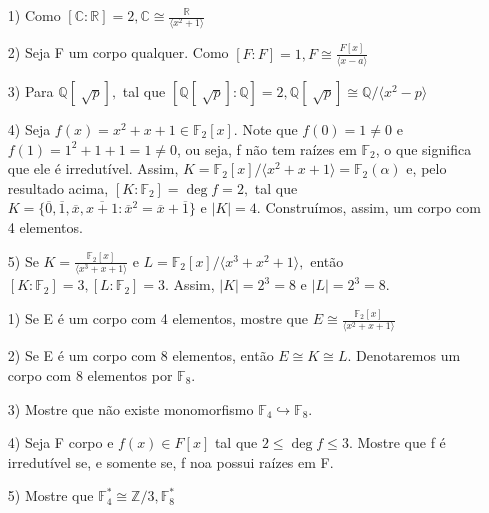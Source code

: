 \documentclass[algebraII_notes.tex]{subfiles}
\begin{document}
\begin{example}
	\begin{itemize}
		\item[1)] Como \([\mathbb{C}:\mathbb{R}]=2, \mathbb{C}\cong{\frac{\mathbb{R}}{\langle x^{2} + 1 \rangle}}\)
		\item[2)] Seja F um corpo qualquer. Como \([F:F] = 1, F\cong{\frac{F[x]}{\langle x-a \rangle}}\)
		\item[3)] Para \(\mathbb{Q}[\sqrt[]{p}],\) tal que \([\mathbb{Q}[\sqrt[]{p}]:\mathbb{Q}]=2, \mathbb{Q}[\sqrt[]{p}]\cong{\mathbb{Q}/\langle x^{2}-p \rangle}\)
		\item[4)] Seja \(f(x) = x^{2} + x + 1\in \mathbb{F}_{2}[x].\) Note que \(f(0) = 1\neq0\) e \(f(1) = 1^{2} + 1 + 1 = 1\neq0\), ou seja,
		      f não tem raízes em \(\mathbb{F}_{2}\), o que significa que ele é irredutível. Assim, \(K = \mathbb{F}_{2}[x]/\langle x^{2}+x+1 \rangle = \mathbb{F}_{2}(\alpha )\)
		      e, pelo resultado acima, \([K:\mathbb{F}_{2}] = \deg{f} = 2,\) tal que \(K = \{\overline{0}, \overline{1}, \overline{x}, \overline{x+1}: \overline{x}^{2} = \overline{x} + \overline{1}\}\)
		      e \(|K| = 4.\) Construímos, assim, um corpo com 4 elementos.
		\item[5)] Se \(K = \frac{\mathbb{F}_{2}[x]}{\langle x^{3} + x + 1 \rangle}\) e \(L = \mathbb{F}_{2}[x]/\langle x^{3}+x^{2}+1 \rangle,\) então \([K:\mathbb{F}_{2}] = 3, [L:\mathbb{F}_{2}]=3\).
		      Assim, \(|K| = 2^{3} = 8\) e \(|L| = 2^{3} = 8\).
	\end{itemize}
\end{example}
\begin{example}[Exercícios]
	\begin{itemize}
		\item[1)] Se E é um corpo com 4 elementos, mostre que \(E\cong{\frac{\mathbb{F}_{2}[x]}{\langle x^{2}+x+1 \rangle}}\)
		\item[2)] Se E é um corpo com 8 elementos, então \(E\cong{K}\cong{L}.\) Denotaremos um corpo com 8 elementos por \(\mathbb{F}_{8}.\)
		\item[3)] Mostre que não existe monomorfismo \(\mathbb{F}_{4}\hookrightarrow \mathbb{F}_{8}.\)
		\item[4)] Seja F corpo e \(f(x)\in F[x]\) tal que \(2\leq \deg{f}\leq 3\). Mostre que f é irredutível se, e somente se, f noa possui raízes em F.
		\item[5)] Mostre que \(\mathbb{F}_{4}^{*}\cong{\mathbb{Z}/3}, \mathbb{F}_{8}^{*}\)
	\end{itemize}
\end{example}
\end{document}
